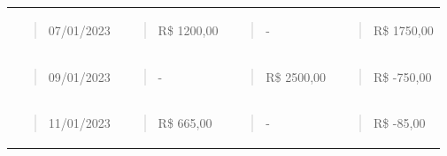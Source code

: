 \begin{longtable}[]{@{}llll@{}}
\begin{minipage}[t]{0.18\columnwidth}
\begin{quote}
07/01/2023
\end{quote}\strut
\end{minipage} & \begin{minipage}[t]{0.20\columnwidth}\raggedright
\begin{quote}
R\$ 1200,00
\end{quote}\strut
\end{minipage} & \begin{minipage}[t]{0.20\columnwidth}\raggedright
\begin{quote}
-
\end{quote}\strut
\end{minipage} & \begin{minipage}[t]{0.20\columnwidth}\raggedright
\begin{quote}
R\$ 1750,00
\end{quote}\strut
\end{minipage}\tabularnewline
\begin{minipage}[t]{0.18\columnwidth}\raggedright
\begin{quote}
09/01/2023
\end{quote}\strut
\end{minipage} & \begin{minipage}[t]{0.20\columnwidth}\raggedright
\begin{quote}
-
\end{quote}\strut
\end{minipage} & \begin{minipage}[t]{0.20\columnwidth}\raggedright
\begin{quote}
R\$ 2500,00
\end{quote}\strut
\end{minipage} & \begin{minipage}[t]{0.20\columnwidth}\raggedright
\begin{quote}
R\$ -750,00
\end{quote}\strut
\end{minipage}\tabularnewline
\begin{minipage}[t]{0.18\columnwidth}\raggedright
\begin{quote}
11/01/2023
\end{quote}\strut
\end{minipage} & \begin{minipage}[t]{0.20\columnwidth}\raggedright
\begin{quote}
R\$ 665,00
\end{quote}\strut
\end{minipage} & \begin{minipage}[t]{0.20\columnwidth}\raggedright
\begin{quote}
-
\end{quote}\strut
\end{minipage} & \begin{minipage}[t]{0.20\columnwidth}\raggedright
\begin{quote}
R\$ -85,00
\end{quote}\strut
\end{minipage}\tabularnewline
\bottomrule
\end{longtable}


